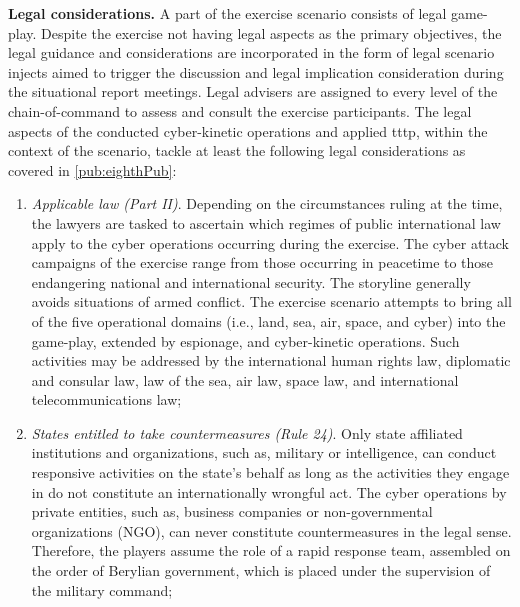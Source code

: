 \textbf{Legal considerations.}
A part of the exercise scenario consists of legal game-play. Despite the exercise not having legal aspects as the primary objectives, the legal guidance and considerations are incorporated in the form of legal scenario injects aimed to trigger the discussion and legal implication consideration during the situational report meetings. Legal advisers are assigned to every level of the chain-of-command to assess and consult the exercise participants. 
The legal aspects of the conducted cyber-kinetic operations and applied \gls{tttp}, within the context of the scenario, tackle at least the following legal considerations as covered in \ref{pub:eighthPub}:
\begin{enumerate}
    \item \textit{Applicable law (Part II)}.
    Depending on the circumstances ruling at the time, the lawyers are tasked to ascertain which regimes of public international law apply to the cyber operations occurring during the exercise. The cyber attack campaigns of the exercise range from those occurring in peacetime to those endangering national and international security. The storyline generally avoids situations of armed conflict. The exercise scenario attempts to bring all of the five operational domains (i.e., land, sea, air, space, and cyber) into the game-play, extended by espionage, and cyber-kinetic operations. Such activities may be addressed by the international human rights law, diplomatic and consular law, law of the sea, air law, space law, and international telecommunications law;
    \item \textit{States entitled to take countermeasures (Rule 24)}. Only state affiliated institutions and organizations, such as, military or intelligence, can conduct responsive activities on the state's behalf as long as the activities they engage in do not constitute an internationally wrongful act. The cyber operations by private entities, such as, business companies or non-governmental organizations (NGO), can never constitute countermeasures in the legal sense. Therefore, the players assume the role of a rapid response team, assembled  on the order of Berylian government, which is placed under the supervision of the military command;

\end{enumerate}
